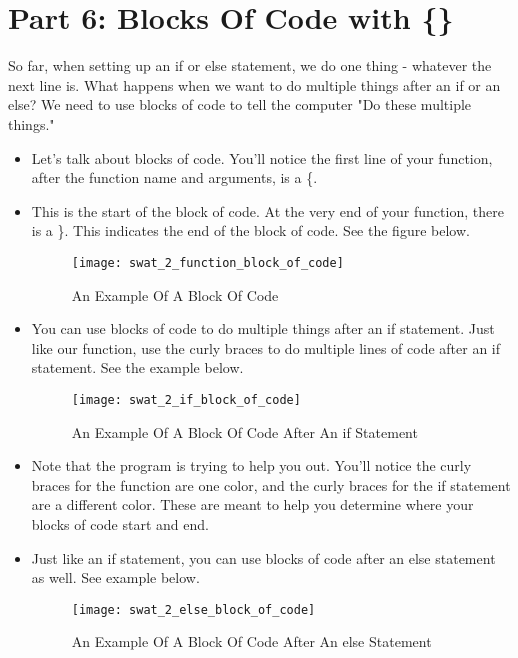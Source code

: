 \documentclass{article}
\begin{document}
\section*{Part 6: Blocks Of Code with \{\}}
So far, when setting up an if or else statement, we do one thing - whatever the next line is.  What happens when we want to do multiple things after an if or an else?  We need to use blocks of code to tell the computer "Do these multiple things."
\begin{itemize}
	\item Let's talk about blocks of code.  You'll notice the first line of your function, after the function name and arguments, is a \{.
	\item This is the start of the block of code.  At the very end of your function, there is a \}.  This indicates the end of the block of code.  See the figure below.
	\begin{figure}[H]
  		\centering
  		\texttt{[image: swat\_2\_function\_block\_of\_code]}
  		\caption{An Example Of A Block Of Code}
	\end{figure}
	\item You can use blocks of code to do multiple things after an if statement.  Just like our function, use the curly braces to do multiple lines of code after an if statement.  See the example below.
	\begin{figure}[H]
  		\centering
  		\texttt{[image: swat\_2\_if\_block\_of\_code]}
  		\caption{An Example Of A Block Of Code After An if Statement}
	\end{figure}
	\item Note that the program is trying to help you out.  You'll notice the curly braces for the function are one color, and the curly braces for the if statement are a different color.  These are meant to help you determine where your blocks of code start and end.
	\item Just like an if statement, you can use blocks of code after an else statement as well.  See example below.
	\begin{figure}[H]
  		\centering
  		\texttt{[image: swat\_2\_else\_block\_of\_code]}
  		\caption{An Example Of A Block Of Code After An else Statement}
	\end{figure}
\end{itemize}
\end{document}

